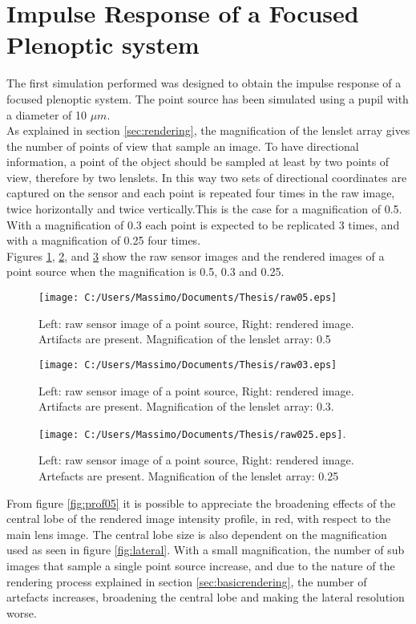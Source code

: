 \section{Impulse Response of a Focused Plenoptic system}
\label{sec:impulse}
The first simulation performed was designed to obtain the impulse response of a focused plenoptic system. The point source has been simulated using a pupil with a diameter of 10 $\mu m$.\\
As explained in section \ref{sec:rendering}, the magnification of the lenslet array gives the number of points of view that sample an image. To have directional information, a point of the object should be sampled at least by two points of view, therefore by two  lenslets. In this way two sets of directional coordinates are captured on the sensor and each point is repeated four times in the raw image, twice horizontally and twice vertically.This is the case for a magnification of 0.5. With a magnification of 0.3 each point is expected to be replicated 3 times, and with a magnification of 0.25 four times.\\
Figures \ref{fig:point05}, \ref{fig:point03}, and \ref{fig:point025} show the raw sensor images and the rendered images of a point source when the magnification is 0.5, 0.3 and 0.25.  
\begin{figure}[H]
	\centering
	\texttt{[image: C:/Users/Massimo/Documents/Thesis/raw05.eps]}
	\caption{\label{fig:point05} Left: raw sensor image of a point source, Right: rendered image. Artifacts are present. Magnification of the lenslet array: 0.5 }
\end{figure}
\begin{figure}[H]
	\centering
	\texttt{[image: C:/Users/Massimo/Documents/Thesis/raw03.eps]}
	\caption{\label{fig:point03} Left: raw sensor image of a point source, Right: rendered image. Artifacts are present. Magnification of the lenslet array: 0.3.}
\end{figure}
\begin{figure}[H]
	\centering
	\texttt{[image: C:/Users/Massimo/Documents/Thesis/raw025.eps]}.
	\caption{\label{fig:point025} Left: raw sensor image of a point source, Right: rendered image. Artefacts are present. Magnification of the lenslet array: 0.25 }
\end{figure}
From figure \ref{fig:prof05} it is possible to appreciate the broadening effects of the central lobe of the rendered image intensity profile, in red, with respect to the main lens image. The central lobe size is also dependent on the magnification used as seen in figure \ref{fig:lateral}. With a small magnification, the number of sub images that sample a single point source increase, and due to the nature of the rendering process explained in section \ref{sec:basicrendering}, the number of artefacts increases, broadening the central lobe and making the lateral resolution worse.
